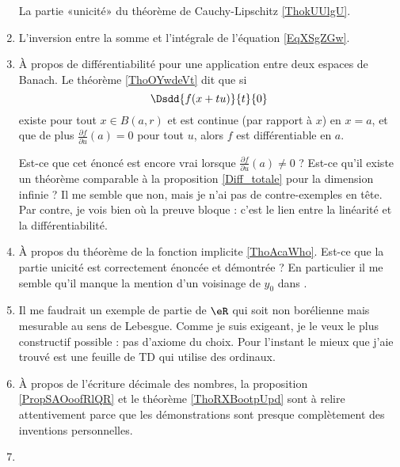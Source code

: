 \begin{enumerate}
        La partie «unicité» du théorème de Cauchy-Lipschitz \ref{ThokUUlgU}.
    \item
        L'inversion entre la somme et l'intégrale de l'équation \eqref{EqXSgZGw}.
    \item   \label{ItemLPrIWZhPg}
        À propos de différentiabilité pour une application entre deux espaces de Banach. Le théorème \ref{ThoOYwdeVt} dit que si
    \begin{equation}
        \Dsdd{ f(x+tu) }{t}{0}
    \end{equation}
    existe pour tout \( x\in B(a,r)\) et est continue (par rapport à \( x\)) en \( x=a\), et que de plus \( \frac{ \partial f }{ \partial u }(a)=0\) pour tout \( u\), alors \( f\) est différentiable en \( a\).

    Est-ce que cet énoncé est encore vrai lorsque \( \frac{ \partial f }{ \partial u }(a)\neq 0\) ? Est-ce qu'il existe un théorème comparable à la proposition \ref{Diff_totale} pour la dimension infinie ? Il me semble que non, mais je n'ai pas de contre-exemples en tête. Par contre, je vois bien où la preuve bloque : c'est le lien entre la linéarité et la différentiabilité.


    \item

        À propos du théorème de la fonction implicite \ref{ThoAcaWho}. Est-ce que la partie unicité est correctement énoncée et démontrée ? En particulier il me semble qu'il manque la mention d'un voisinage de \( y_0\) dans \cite{SNPdukn}.

    \item

        Il me faudrait un exemple de partie de \( \eR\) qui soit non borélienne mais mesurable au sens de Lebesgue. Comme je suis exigeant, je le veux le plus constructif possible : pas d'axiome du choix. Pour l'instant le mieux que j'aie trouvé est une feuille de TD\cite{XSHoosgoQa} qui utilise des ordinaux.

    \item

        À propos de l'écriture décimale des nombres, la proposition \ref{PropSAOoofRlQR} et le théorème \ref{ThoRXBootpUpd} sont à relire attentivement parce que les démonstrations sont presque complètement des inventions personnelles.

    \item


\end{enumerate}
